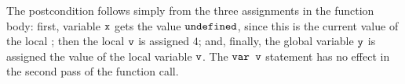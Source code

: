 \documentclass{article}
\begin{document}

The postcondition follows simply from the three assignments in the function body:
first, variable $\mbox{\texttt{{\upshape x}}}$ gets the value $\mbox{\texttt{{\upshape undefined}}}$, since this is the current value of the local ; then the local $\mbox{\texttt{{\upshape v}}}$ is assigned $4$; and, finally, the global variable $\mbox{\texttt{{\upshape y}}}$ is assigned the value of the local variable $\mbox{\texttt{{\upshape v}}}$.
The $\mbox{\texttt{{\upshape var v}}}$
statement has no effect in the second pass of the function call. 


\end{document}
